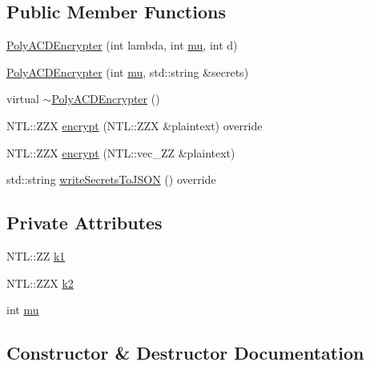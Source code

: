 \subsection*{Public Member Functions}
\begin{DoxyCompactItemize}
\item 
\hyperlink{classPolyACDEncrypter_aa8129aeb902913825c980316157b33e4}{Poly\+A\+C\+D\+Encrypter} (int lambda, int \hyperlink{classPolyACDEncrypter_a3afaccbe1fbc6379e6061f1489e9a253}{mu}, int d)
\item 
\hyperlink{classPolyACDEncrypter_abae92af62b71ad8f52e786a4263f981f}{Poly\+A\+C\+D\+Encrypter} (int \hyperlink{classPolyACDEncrypter_a3afaccbe1fbc6379e6061f1489e9a253}{mu}, std\+::string \&secrets)
\item 
virtual \hyperlink{classPolyACDEncrypter_a63824228dbc9c64ccdbddc154069592b}{$\sim$\+Poly\+A\+C\+D\+Encrypter} ()
\item 
N\+T\+L\+::\+Z\+ZX \hyperlink{classPolyACDEncrypter_a5233a73398d39d93567392c64a120e1e}{encrypt} (N\+T\+L\+::\+Z\+ZX \&plaintext) override
\item 
N\+T\+L\+::\+Z\+ZX \hyperlink{classPolyACDEncrypter_ae4de72005efe6dc0dca2d2b41a655b3a}{encrypt} (N\+T\+L\+::vec\+\_\+\+ZZ \&plaintext)
\item 
std\+::string \hyperlink{classPolyACDEncrypter_af478f2fe3f886d23749955eaa72e413b}{write\+Secrets\+To\+J\+S\+ON} () override
\end{DoxyCompactItemize}
\subsection*{Private Attributes}
\begin{DoxyCompactItemize}
\item 
N\+T\+L\+::\+ZZ \hyperlink{classPolyACDEncrypter_a198e96b474e1a02590aeb55d7fe348d7}{k1}
\item 
N\+T\+L\+::\+Z\+ZX \hyperlink{classPolyACDEncrypter_aa4de2f8e1e03808b7a7c7b9576084482}{k2}
\item 
int \hyperlink{classPolyACDEncrypter_a3afaccbe1fbc6379e6061f1489e9a253}{mu}
\end{DoxyCompactItemize}


\subsection{Constructor \& Destructor Documentation}
\mbox{\label{classPolyACDEncrypter_aa8129aeb902913825c980316157b33e4}} 
